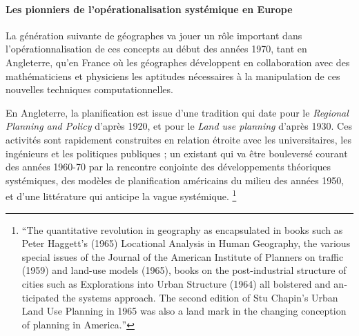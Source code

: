 \paragraph{Les pionniers de l'opérationalisation systémique en Europe}

La génération suivante de géographes va jouer un rôle important dans l'opérationnalisation de ces concepts au début des années 1970, tant en Angleterre, qu'en France où les géographes développent en collaboration avec des mathématiciens et physiciens les aptitudes nécessaires à la manipulation de ces nouvelles techniques computationnelles. \autocite{Pumain2002}

En Angleterre, la planification est issue d'une tradition qui date pour le \textit{Regional Planning and Policy} d'après 1920, et pour le \textit{Land use planning} d'après 1930. Ces activités sont rapidement construites en relation étroite avec les universitaires, les ingénieurs et les politiques publiques \autocites{Bennett2003}[727]{Davies1997}; un existant qui va être bouleversé courant des années 1960-70 par la rencontre conjointe des développements théoriques systémiques, des modèles de planification américains du milieu des années 1950, et d'une littérature qui anticipe la vague systémique. \autocites{Mcloughin1969}[4-8]{McLoughin1985}[253]{Batty1978} \footnote{\foreignquote{english}{The quantitative revolution in geography as encapsulated in books such as Peter Haggett's (1965) Locational Analysis in Human Geography, the various special issues of the Journal of the American Institute of Planners on traffic (1959) and land-use models (1965), books on the post-industrial structure of cities such as Explorations into Urban Structure (1964) all bolstered and anticipated the systems approach. The second edition of Stu Chapin's Urban Land Use Planning in 1965 was also a land mark in the changing conception of planning in America.}}

